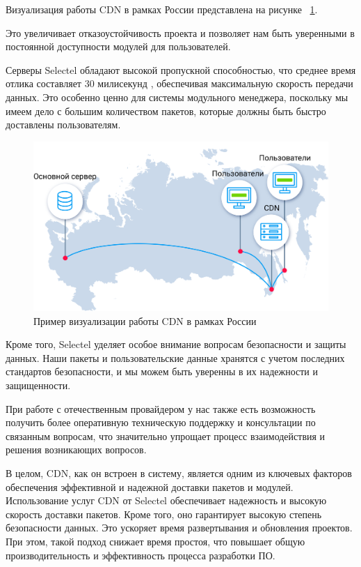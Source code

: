 Визуализация работы CDN в рамках России представлена на рисунке ~\ref{fig:cdn_russia}.

Это увеличивает отказоустойчивость проекта и позволяет нам быть уверенными в постоянной доступности модулей для пользователей.

Серверы Selectel обладают высокой пропускной способностью, что среднее время отлика составляет 30 милисекунд \cite{cdn:selectel}, обеспечивая максимальную скорость передачи данных. Это особенно ценно для системы модульного менеджера, поскольку мы имеем дело с большим количеством пакетов, которые должны быть быстро доставлены пользователям.

\begin{figure}
  \centering
  \includegraphics[width=.75\textwidth]{graphics/img/cdn.scheme.5Y4Ydf}
  \caption{Пример визуализации работы CDN в рамках России}
  \label{fig:cdn_russia}
\end{figure}

Кроме того, Selectel уделяет особое внимание вопросам безопасности и защиты данных. Наши пакеты и пользовательские данные хранятся с учетом последних стандартов безопасности, и мы можем быть уверенны в их надежности и защищенности.

При работе с отечественным провайдером у нас также есть возможность получить более оперативную техническую поддержку и консультации по связанным вопросам, что значительно упрощает процесс взаимодействия и решения возникающих вопросов.

В целом, CDN, как он встроен в систему, является одним из ключевых факторов обеспечения эффективной и надежной доставки пакетов и модулей. Использование услуг CDN от Selectel обеспечивает надежность и высокую скорость доставки пакетов. Кроме того, оно гарантирует высокую степень безопасности данных. Это ускоряет время развертывания и обновления проектов. При этом, такой подход снижает время простоя, что повышает общую производительность и эффективность процесса разработки ПО.

